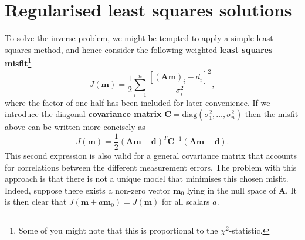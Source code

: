 \section*{Regularised least squares solutions}
To solve the inverse problem, we might be tempted to apply a simple least squares method, and hence consider the
 following weighted \textbf{least squares misfit}\footnote{Some of you might note that this is proportional to the $\chi^{2}$-statistic.}
\begin{equation}
    J(\mathbf{m}) = \frac{1}{2} \sum_{i=1}^{n} \frac{[(\mathbf{A}\mathbf{m})_{i} - d_{i}]^{2}}{\sigma_{i}^{2}},
    \label{eq:18}
\end{equation}
where the factor of one half has been included for later convenience. If we introduce the diagonal \textbf{covariance matrix}
 $\mathbf{C}=\mathrm{diag}(\sigma_{1}^{2},\dots,\sigma_{n}^{2})$ then the misfit above can be written more concisely as
\begin{equation}
    J(\mathbf{m}) = \frac{1}{2} (\mathbf{A}\mathbf{m} - \mathbf{d})^{T} \mathbf{C}^{-1} (\mathbf{A}\mathbf{m} - \mathbf{d}).
    \label{eq:19}
\end{equation}
This second expression is also valid for a general covariance matrix that accounts for correlations between the different
 measurement errors. The problem with this approach is that there is not a unique model that minimises this chosen misfit.
  Indeed, suppose there exists a non-zero vector $\mathbf{m}_{0}$ lying in the null space of $\mathbf{A}$. It is then clear
   that $J(\mathbf{m} + a\mathbf{m}_{0}) = J(\mathbf{m})$ for all scalars $a$.


